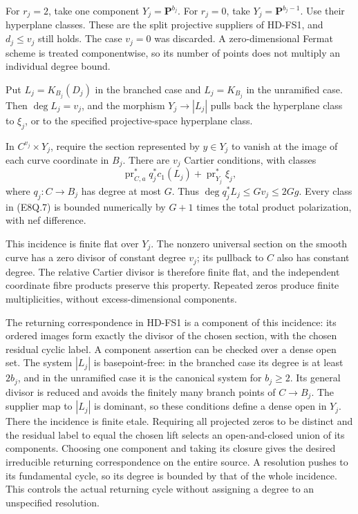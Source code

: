 For \(r_j=2\), take one component \(Y_j=\mathbf P^{b_j}\).
For \(r_j=0\), take \(Y_j=\mathbf P^{b_j-1}\). Use their
hyperplane classes. These are the split projective suppliers
of HD-FS1, and \(d_j\le v_j\) still holds. The case \(v_j=0\)
was discarded. A zero-dimensional Fermat scheme is treated
componentwise, so its number of points does not multiply an
individual degree bound.

Put \(L_j=K_{B_j}(D_j)\) in the branched case and
\(L_j=K_{B_j}\) in the unramified case. Then
\(\deg L_j=v_j\), and the morphism \(Y_j\to|L_j|\)
pulls back the hyperplane class to \(\xi_j\), or to the
specified projective-space hyperplane class.

In \(C^{v_j}\times Y_j\), require the section represented by
\(y\in Y_j\) to vanish at the image of each curve coordinate
in \(B_j\). There are \(v_j\) Cartier conditions, with classes
\[
 \operatorname{pr}_{C,a}^*q_j^*c_1(L_j)
                     +\operatorname{pr}_{Y_j}^*\xi_j,          \tag{E8Q.7}
\]
where \(q_j:C\to B_j\) has degree at most \(G\).
Thus \(\deg q_j^*L_j\le Gv_j\le2Gg\). Every class in
(E8Q.7) is bounded numerically by \(G+1\) times the total
product polarization, with nef difference.

This incidence is finite flat over \(Y_j\). The nonzero
universal section on the smooth curve has a zero divisor of
constant degree \(v_j\); its pullback to \(C\) also has
constant degree. The relative Cartier divisor is therefore
finite flat, and the independent coordinate fibre products
preserve this property. Repeated zeros produce finite
multiplicities, without excess-dimensional components.

The returning correspondence in HD-FS1 is a component of
this incidence: its ordered images form exactly the divisor
of the chosen section, with the chosen residual cyclic label.
A component assertion can be checked over a dense open set.
The system \(|L_j|\) is basepoint-free: in the branched
case its degree is at least \(2b_j\), and in the unramified
case it is the canonical system for \(b_j\ge2\).
Its general divisor is reduced and avoids the finitely many
branch points of \(C\to B_j\). The supplier map to
\(|L_j|\) is dominant, so these conditions define a dense
open in \(Y_j\). There the incidence is finite etale.
Requiring all projected zeros to be distinct and the
residual label to equal the chosen lift selects an
open-and-closed union of its components. Choosing one
component and taking its closure gives the desired
irreducible returning correspondence on the entire source.
A resolution pushes to its fundamental cycle, so its degree
is bounded by that of the whole incidence. This controls the
actual returning cycle without assigning a degree to an
unspecified resolution.

